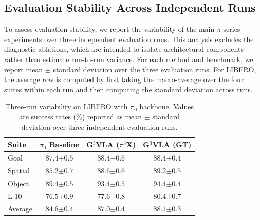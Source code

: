 \subsection{Evaluation Stability Across Independent Runs}
\label{app:evaluation_stability}

To assess evaluation stability, we report the variability of the main $\pi$-series experiments over three independent evaluation runs. 
This analysis excludes the diagnostic ablations, which are intended to isolate architectural components rather than estimate run-to-run variance. 
For each method and benchmark, we report mean $\pm$ standard deviation over the three evaluation runs. 
For LIBERO, the average row is computed by first taking the macro-average over the four suites within each run and then computing the standard deviation across runs.

\begin{table}[H]
\centering
\small
\setlength{\tabcolsep}{3.5pt}
\begin{tabular}{lccc}
\toprule
Suite & $\pi_0$ Baseline & G$^3$VLA ($\pi^3$X) & G$^3$VLA (GT) \\
\midrule
Goal    & $87.4{\scriptstyle \pm 0.5}$ & $88.4{\scriptstyle \pm 0.6}$ & $88.4{\scriptstyle \pm 0.4}$ \\
Spatial & $85.2{\scriptstyle \pm 0.7}$ & $88.6{\scriptstyle \pm 0.6}$ & $89.2{\scriptstyle \pm 0.5}$ \\
Object  & $89.4{\scriptstyle \pm 0.5}$ & $93.4{\scriptstyle \pm 0.5}$ & $94.4{\scriptstyle \pm 0.4}$ \\
L-10    & $76.5{\scriptstyle \pm 0.9}$ & $77.6{\scriptstyle \pm 0.8}$ & $80.4{\scriptstyle \pm 0.7}$ \\
\midrule
Average & $84.6{\scriptstyle \pm 0.4}$ & $87.0{\scriptstyle \pm 0.4}$ & $88.1{\scriptstyle \pm 0.3}$ \\
\bottomrule
\end{tabular}
\caption{Three-run variability on LIBERO with $\pi_0$ backbone. Values are success rates (\%) reported as mean $\pm$ standard deviation over three independent evaluation runs.}
\label{tab:libero_pi0_three_run}
\end{table}

